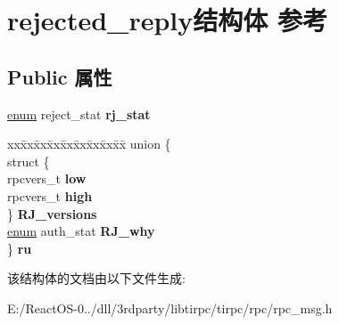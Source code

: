 \hypertarget{structrejected__reply}{}\section{rejected\+\_\+reply结构体 参考}
\label{structrejected__reply}
\subsection*{Public 属性}
\begin{DoxyCompactItemize}
\item 
\mbox{\label{structrejected__reply_a8e3f589d39643093254858e67dfd0159}} 
\hyperlink{interfaceenum}{enum} reject\+\_\+stat {\bfseries rj\+\_\+stat}
\item 
\mbox{\label{structrejected__reply_a76e400ab9be3921a0f206dbf908669f1}} 
\begin{tabbing}
xx\=xx\=xx\=xx\=xx\=xx\=xx\=xx\=xx\=\kill
union \{\\
\>struct \{\\
\>\>rpcvers\_t {\bfseries low}\\
\>\>rpcvers\_t {\bfseries high}\\
\>\} {\bfseries RJ\_versions}\\
\>\hyperlink{interfaceenum}{enum} auth\_stat {\bfseries RJ\_why}\\
\} {\bfseries ru}\\

\end{tabbing}\end{DoxyCompactItemize}


该结构体的文档由以下文件生成\+:\begin{DoxyCompactItemize}
\item 
E\+:/\+React\+O\+S-\/0../dll/3rdparty/libtirpc/tirpc/rpc/rpc\+\_\+msg.\+h\end{DoxyCompactItemize}
